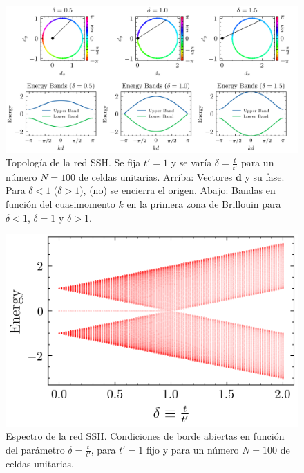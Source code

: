 \begin{figure}[h]
	\centering
	\includegraphics[width=\linewidth]{media/ssh-winding}
	\caption[Topología de la red SSH.]{Topología de la red SSH. Se fija $t'=1$ y se varía $\delta=\frac{t}{t'}$ para un número $N=100$ de celdas unitarias. Arriba: Vectores $\textbf{d}$ y su fase. Para $\delta < 1$ ($\delta > 1$), (no) se encierra el origen. Abajo: Bandas en función del cuasimomento $k$ en la primera zona de Brillouin para $\delta < 1$, $\delta = 1$ y $\delta > 1$. 
	\label{fig:ssh-topo}}
\end{figure} \begin{figure}[h]
\centering	\includegraphics[width=0.7\linewidth]{media/ssh-open}
	\caption[Espectro de la red SSH.]{Espectro de la red SSH. Condiciones de borde abiertas en función del parámetro $\delta=\frac{t}{t'}$, para $t'=1$ fijo y para un número $N=100$ de celdas unitarias.
	\label{fig:ssh-open}}
\end{figure} 

